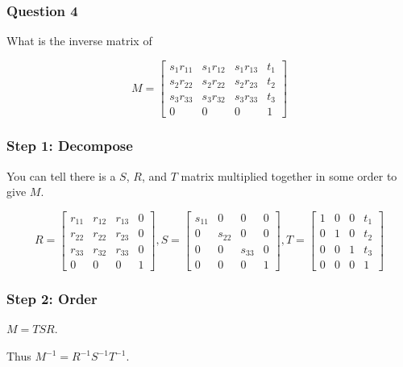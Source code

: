 \documentclass{beamer}
\begin{document}
\begin{frame}
    \frametitle{Question 4}

    What is the inverse matrix of 

    \begin{center}
        $$ M = 
        \left[
        \begin{matrix}
            s_1 r_{11} & s_1 r_{12} & s_1 r_{13} & t_1\\
            s_2 r_{22} & s_2 r_{22} & s_2 r_{23} & t_2\\
            s_3 r_{33} & s_3 r_{32} & s_3 r_{33} & t_3\\
            0 & 0 & 0 & 1
        \end{matrix}
        \right]
        $$
        
    \end{center}

\end{frame}

\begin{frame}
    \frametitle{Step 1: Decompose}

    You can tell there is a $S$, $R$, and $T$ matrix multiplied together in some order to give $M$.

    $$ R = 
    \left[
    \begin{matrix}
        r_{11} & r_{12} & r_{13} & 0\\
        r_{22} & r_{22} & r_{23} & 0\\
        r_{33} & r_{32} & r_{33} & 0\\
        0 & 0 & 0 & 1
    \end{matrix}
    \right],
    S =
    \left[
    \begin{matrix}
        s_{11} & 0 & 0 & 0\\
        0 & s_{22} & 0 & 0\\
        0 & 0 & s_{33} & 0\\
        0 & 0 & 0 & 1
    \end{matrix}
    \right],
    T =
    \left[
    \begin{matrix}
        1 & 0 & 0 & t_1\\
        0 & 1 & 0 & t_2\\
        0 & 0 & 1 & t_3\\
        0 & 0 & 0 & 1
    \end{matrix}
    \right]
    $$

\end{frame}

\begin{frame}
    \frametitle{Step 2: Order}

    $M = TSR$.

    \vspace{1em}

    Thus $M^{-1} = R^{-1} S^{-1} T^{-1}$.

\end{frame}
\end{document}
